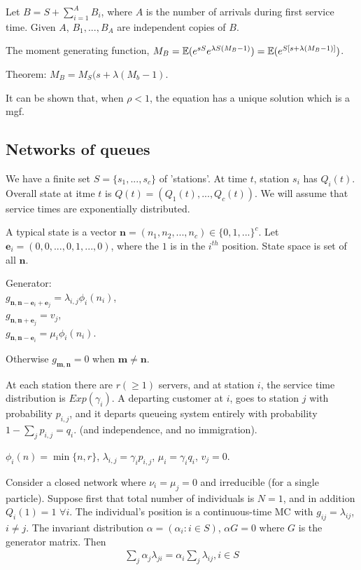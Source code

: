 \documentclass[a4paper]{article}
\begin{document}
Let $B = S + \sum_{i=1}^A B_i$, where $A$ is the number of arrivals during first service time. Given $A$, $B_1,...,B_A$ are independent copies of $B$.

The moment generating function, $M_B = \mathbb{E}(e^{sS} e^{\lambda S (M_B-1)}) = \mathbb{E}(e^{S[s+\lambda(M_B-1)]})$.

Theorem: $M_B = M_S (s+\lambda(M_b-1)$.

It can be shown that, when $\rho < 1$, the equation has a unique solution which is a mgf.

\subsection{Networks of queues}

We have a finite set $S = \{s_1,...,s_c\}$ of 'stations'. At time $t$, station $s_i$ has $Q_i(t)$. Overall state at itme $t$ is $Q(t) = (Q_1(t), ..., Q_c(t))$. We will assume that service times are exponentially distributed.

A typical state is a vector $\mathbf{n} = (n_1,n_2,...,n_c) \in \{0,1,...\}^c$. Let $\mathbf{e}_i = (0,0,...,0,1,...,0)$, where the $1$ is in the $i^{th}$ position. State space is set of all $\mathbf{n}$.

Generator:\\
$g_{\mathbf{n},\mathbf{n}-\mathbf{e}_i+\mathbf{e}_j} = \lambda_{i,j} \phi_i(n_i)$,\\
$g_{\mathbf{n},\mathbf{n}+\mathbf{e}_j} = v_j$,\\
$g_{\mathbf{n},\mathbf{n}-\mathbf{e}_i} = \mu_i \phi_i(n_i)$.

Otherwise $g_{\mathbf{m},\mathbf{n}} = 0$ when $\mathbf{m} \neq \mathbf{n}$.

\begin{eg}
At each station there are $r (\geq 1)$ servers, and at station $i$, the service time distribution is $Exp(\gamma_i)$. A departing customer at $i$, goes to station $j$ with probability $p_{i,j}$, and it departs queueing system entirely with probability $1-\sum_{j} p_{i,j} = q_i$. (and independence, and no immigration).

$\phi_i(n) = \min\{n,r\}$, $\lambda_{i,j} = \gamma_i p_{i,j}$, $\mu_i = \gamma_i q_i$, $v_j = 0$.
\end{eg}

Consider a closed network where $\nu_i = \mu_j = 0$ and irreducible (for a single particle). Suppose first that total number of individuals is $N=1$, and in addition $Q_i(1) = 1$ $\forall i$. The individual's position is a continuous-time MC with $g_{ij} = \lambda_{ij}$, $i \neq j$. The invariant distribution $\alpha = (\alpha_i:i \in S)$, $\alpha G =0$ where $G$ is the generator matrix. Then
\begin{equation*}
\begin{aligned}
\sum_j \alpha_j \lambda_{ji} = \alpha_i \sum_j \lambda_{ij}, i \in S
\end{aligned}
\end{equation*}
\end{document}
